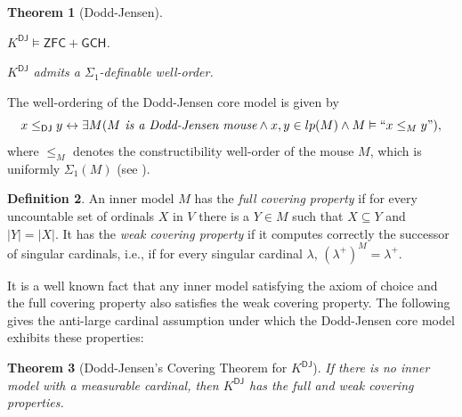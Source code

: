 \documentclass{amsart}
\numberwithin{equation}{section}
\newtheorem{theorem}{Theorem}[section]
\theoremstyle{definition}
\newtheorem{definition}[theorem]{Definition}
\theoremstyle{remark}
\newenvironment{enumerate-(1)-r}{\begin{enumerate}[label={\upshape (\arabic*)}, leftmargin=2pc,resume]}{\end{enumerate}}
\begin{document}
\begin{theorem}[Dodd-Jensen]\text{}\label{theorem:dodd-jensen-core-model-properties}
	\begin{enumerate-(1)-r}
	    \item $K^{\mathsf{DJ}}\vDash\mathsf{ZFC+GCH}$.\label{theorem:dodd-jensen-models-zfc-gch}
        \item $K^{\mathsf{DJ}}$ admits a $\Sigma_1$-definable well-order.\label{theorem:dodd-jensen-sigma-1-definable-well-order}
	\end{enumerate-(1)-r}
\end{theorem}

The well-ordering of the Dodd-Jensen core model is given by
\[
x\leq_{\mathsf{DJ}}y \leftrightarrow \exists M(M\textit{ is a Dodd-Jensen mouse}\wedge x,y\in lp(M) \wedge M\vDash``x\leq_{M}y"),
\]
where $\leq_{M}$ denotes the constructibility well-order of the mouse $M$, which is uniformly $\Sigma_{1}(M)$ (see \cite[p.186]{koepke1988some}).

\begin{definition}\label{def:covering-properties}
	An inner model $M$ has the \emph{full covering property} if for every uncountable set of ordinals $X$ in $V$ there is a $Y\in M$ such that $X\subseteq Y$ and $|Y|=|X|$. It has the \emph{weak covering property} if it computes correctly the successor of singular cardinals, i.e., if for every singular cardinal $\lambda$, $(\lambda^{+})^{M}=\lambda^{+}$.
\end{definition}

It is a well known fact that any inner model satisfying the axiom of choice and the full covering property also satisfies the weak covering property. The following gives the anti-large cardinal assumption under which the Dodd-Jensen core model exhibits these properties:

\begin{theorem}[Dodd-Jensen's Covering Theorem for $K^{\mathsf{DJ}}$]\label{cvthmkdj} If there is no inner model with a measurable cardinal, then $K^{\mathsf{DJ}}$ has the full and weak covering properties.
\end{theorem}
\end{document}
